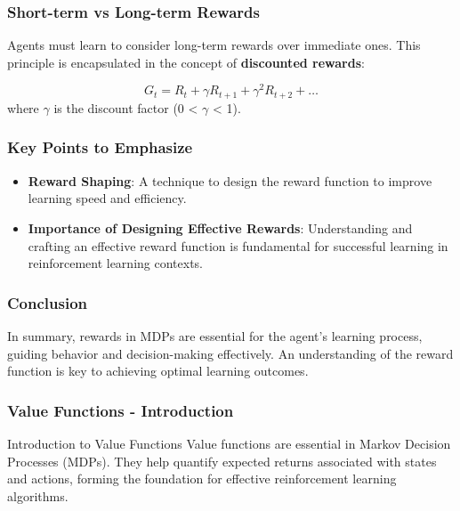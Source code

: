 \documentclass[aspectratio=169]{beamer}
\begin{document}
\begin{frame}[fragile]
    \frametitle{Short-term vs Long-term Rewards}
    
    Agents must learn to consider long-term rewards over immediate ones. This principle is encapsulated in the concept of \textbf{discounted rewards}:
    
    \begin{equation}
    G_t = R_t + \gamma R_{t+1} + \gamma^2 R_{t+2} + \ldots
    \end{equation}
    where \( \gamma \) is the discount factor (0 < \( \gamma \) < 1).
\end{frame}

\begin{frame}[fragile]
    \frametitle{Key Points to Emphasize}
    
    \begin{itemize}
        \item \textbf{Reward Shaping}: A technique to design the reward function to improve learning speed and efficiency.
        \item \textbf{Importance of Designing Effective Rewards}: Understanding and crafting an effective reward function is fundamental for successful learning in reinforcement learning contexts.
    \end{itemize}
\end{frame}

\begin{frame}[fragile]
    \frametitle{Conclusion}
    
    In summary, rewards in MDPs are essential for the agent's learning process, guiding behavior and decision-making effectively. An understanding of the reward function is key to achieving optimal learning outcomes.
\end{frame}

\begin{frame}[fragile]
    \frametitle{Value Functions - Introduction}
    \begin{block}{Introduction to Value Functions}
        Value functions are essential in Markov Decision Processes (MDPs). They help quantify expected returns associated with states and actions, forming the foundation for effective reinforcement learning algorithms.
    \end{block}
\end{frame}
\end{document}
